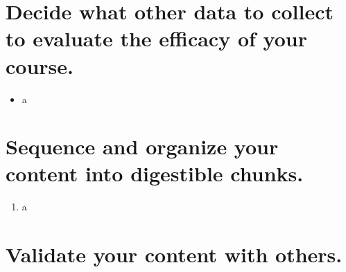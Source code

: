 \documentclass[12pt,notitlepage]{article}
\begin{document}
\section{Decide what other data to collect to evaluate the efficacy of your course.}

\begin{itemize}
\item a
\end{itemize}

\section{Sequence and organize your content into digestible chunks.}
\begin{enumerate}
  \item a
\end{enumerate}

\section{Validate your content with others.}
\end{document}
